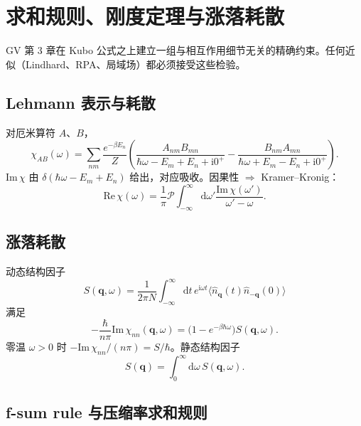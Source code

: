 \section{求和规则、刚度定理与涨落耗散}

GV 第 3 章在 Kubo 公式之上建立一组与相互作用细节无关的精确约束。任何近似（Lindhard、RPA、局域场）都必须接受这些检验。

\subsection{Lehmann 表示与耗散}

对厄米算符 $A$、$B$，
\begin{equation}
  \chi_{AB}(\omega)
  =\sum_{nm}
  \frac{e^{-\beta E_n}}{Z}
  \left(
  \frac{A_{nm}B_{mn}}{\hbar\omega-E_m+E_n+\mathrm{i}0^+}
  -\frac{B_{nm}A_{mn}}{\hbar\omega+E_m-E_n+\mathrm{i}0^+}
  \right).
\end{equation}
$\mathrm{Im}\,\chi$ 由 $\delta(\hbar\omega-E_m+E_n)$ 给出，对应吸收。因果性 $\Rightarrow$ Kramer--Kronig：
\begin{equation}
  \mathrm{Re}\,\chi(\omega)
  =\frac{1}{\pi}\mathcal{P}
  \int_{-\infty}^{\infty}
  \mathrm{d}\omega'
  \frac{\mathrm{Im}\,\chi(\omega')}{\omega'-\omega}.
\end{equation}

\subsection{涨落耗散}

动态结构因子
\begin{equation}
  S(\mathbf{q},\omega)
  =\frac{1}{2\pi N}
  \int_{-\infty}^{\infty}\mathrm{d}t\,
  e^{\mathrm{i}\omega t}
  \bigl\langle
  \hat n_{\mathbf{q}}(t)\hat n_{-\mathbf{q}}(0)
  \bigr\rangle
\end{equation}
满足
\begin{equation}
  -\frac{\hbar}{n\pi}\mathrm{Im}\,\chi_{nn}(\mathbf{q},\omega)
  =\bigl(1-e^{-\beta\hbar\omega}\bigr)S(\mathbf{q},\omega).
\label{eq:FDT_chi}
\end{equation}
零温 $\omega>0$ 时 $-\mathrm{Im}\,\chi_{nn}/(n\pi)=S/\hbar$。静态结构因子
\begin{equation}
  S(\mathbf{q})
  =\int_0^{\infty}\mathrm{d}\omega\,S(\mathbf{q},\omega).
\end{equation}

\subsection{f-sum rule 与压缩率求和规则}

